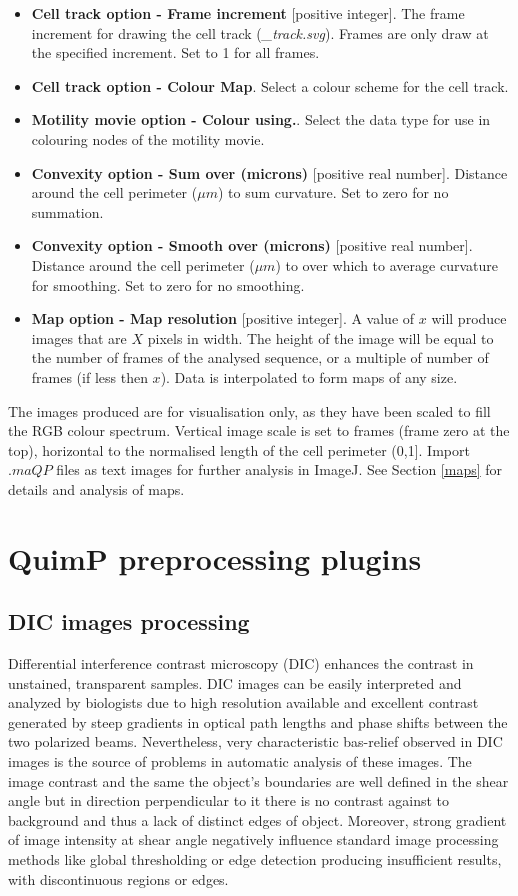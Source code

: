\documentclass[a4paper,12pt]{article}
\begin{document}
\begin{itemize}

\item \textbf{Cell track option - Frame increment}  [positive integer].  The frame increment for drawing the
cell track (\textit{\_track.svg}).  Frames are only draw at the specified increment.  Set to 1 for all frames.  
\item \textbf{Cell track option - Colour Map}.  Select a colour scheme for the cell track.
\item \textbf{Motility movie option - Colour using.}. Select the data type for use in colouring nodes of the motility movie.
\item \textbf{Convexity option - Sum over (microns)} [positive real number].  Distance around the cell 
perimeter ($\mu m$) to sum curvature. Set to zero for no summation.
\item \textbf{Convexity option - Smooth over (microns)} [positive real number].  Distance around the cell 
perimeter ($\mu m$) to over which to average curvature for smoothing. Set to zero for no smoothing.
\item \textbf{Map option - Map resolution} [positive integer]. A value of $x$ will produce images that are
$X$ pixels in width.  The height of the image will be equal to the number of frames of the analysed sequence,
or a multiple of number of frames (if less then $x$). Data is interpolated to form maps of any size.
\end{itemize}

The images produced are for visualisation only, as they have been scaled to fill the RGB colour spectrum.
Vertical image scale is set to frames (frame zero at the top),
horizontal to the normalised length of the cell perimeter (0,1].
Import $.maQP$ files as text images for further analysis in ImageJ. See Section \ref{maps} for details
and analysis of maps.

\section{QuimP preprocessing plugins}
\label{sec:QuimP_preplugins}
\subsection{DIC images processing}
\label{sec:DIC}

Differential interference contrast microscopy (DIC) enhances the contrast in unstained, transparent samples. DIC images can be easily interpreted and analyzed by biologists due to high resolution available and excellent contrast generated by steep gradients in optical path lengths and phase shifts between the two polarized beams. Nevertheless, very characteristic bas-relief observed in DIC images is the source of problems in automatic analysis of these images. The image contrast and the same the object’s boundaries are well defined in the shear angle but in direction perpendicular to it there is no contrast against to background and thus a lack of distinct edges of object. Moreover, strong gradient of image intensity at shear angle negatively influence standard image processing methods like global thresholding or edge detection producing insufficient results, with discontinuous regions or edges.
\end{document}
